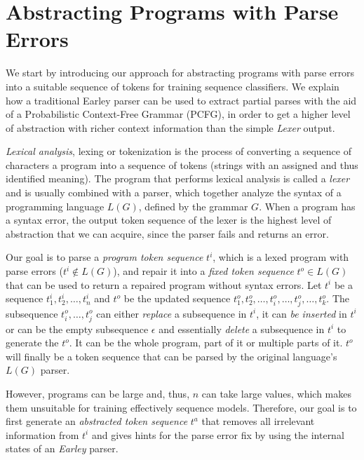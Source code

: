 \section{Abstracting Programs with Parse Errors}
\label{sec:prog-abstract}

We start by introducing our approach for abstracting programs with parse errors
into a suitable sequence of tokens for training sequence classifiers. We explain
how a traditional Earley parser can be used to extract partial parses with the
aid of a Probabilistic Context-Free Grammar (PCFG), in order to get a higher
level of abstraction with richer context information than the simple
\emph{Lexer} output.



\emph{Lexical analysis}, lexing or tokenization is the process of converting a
sequence of characters \ie a program into a sequence of tokens (strings with an
assigned and thus identified meaning). The program that performs lexical
analysis is called a \emph{lexer} and is usually combined with a parser, which
together analyze the syntax of a programming language $L(G)$, defined by the
grammar $G$. When a program has a syntax error, the output token sequence of the
lexer is the highest level of abstraction that we can acquire, since the parser
fails and returns an error.

Our goal is to parse a \emph{program token sequence} $t^i$, which is a lexed
program with parse errors (\ie $t^i \notin L(G)$), and repair it into a
\emph{fixed token sequence} $t^o \in L(G)$ that can be used to return a repaired
program without syntax errors. Let $t^i$ be a sequence $t^i_1, t^i_2, \dots,
t^i_n$ and $t^o$ be the updated sequence $t^o_1, t^o_2, \dots, t^o_i, \dots,
t^o_j, \dots, t^o_k$. The subsequence $t^o_i, \dots, t^o_j$ can either
\emph{replace} a subsequence in $t^i$, it can \emph{be inserted} in $t^i$ or can
be the empty subsequence $\epsilon$ and essentially \emph{delete} a subsequence
in $t^i$ to generate the $t^o$. It can be the whole program, part of it or
multiple parts of it. $t^o$ will finally be a token sequence that can be parsed
by the original language's $L(G)$ parser.

However, programs can be large and, thus, $n$ can take large values, which makes
them unsuitable for training effectively sequence models. Therefore, our goal is
to first generate an \emph{abstracted token sequence} $t^a$ that removes all
irrelevant information from $t^i$ and gives hints for the parse error fix by
using the internal states of an \emph{Earley} parser.


